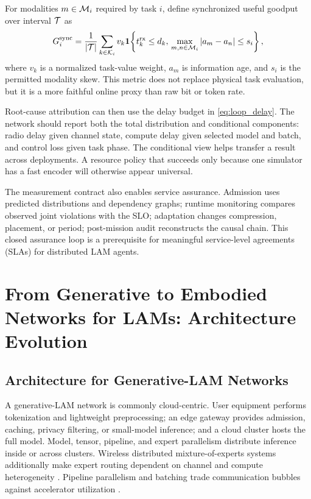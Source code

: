 \documentclass[letterpaper,journal]{IEEEtran}
\begin{document}
For modalities $m\in{\cal M}_i$ required by task $i$, define synchronized
useful goodput over interval ${\cal T}$ as
\begin{equation}
G_i^{\rm sync}=
\frac{1}{|{\cal T}|}
\sum_{k\in{\cal K}_i}
v_k{\bf 1}\!\left\{
t_k^{\rm rx}\le d_k,\,
\max_{m,n\in{\cal M}_i}|a_m-a_n|\le s_i
\right\},
\label{eq:syncgoodput}
\end{equation}
where $v_k$ is a normalized task-value weight, $a_m$ is information age, and
$s_i$ is the permitted modality skew. This metric does not replace physical
task evaluation, but it is a more faithful online proxy than raw bit or token
rate.

Root-cause attribution can then use the delay budget in
\eqref{eq:loop_delay}. The network should report both the total distribution
and conditional components: radio delay given channel state, compute delay
given selected model and batch, and control loss given task phase. The
conditional view helps transfer a result across deployments. A resource
policy that succeeds only because one simulator has a fast encoder will
otherwise appear universal.

The measurement contract also enables service assurance. Admission uses
predicted distributions and dependency graphs; runtime monitoring compares
observed joint violations with the SLO; adaptation changes compression,
placement, or period; post-mission audit reconstructs the causal chain. This
closed assurance loop is a prerequisite for meaningful service-level
agreements (SLAs) for distributed LAM agents.

\section{From Generative to Embodied Networks for LAMs: Architecture Evolution}
\label{sec:architecture}

\subsection{Architecture for Generative-LAM Networks}
A generative-LAM network is commonly cloud-centric. User equipment performs
tokenization and lightweight preprocessing; an edge gateway provides
admission, caching, privacy filtering, or small-model inference; and a cloud
cluster hosts the full model. Model, tensor, pipeline, and expert parallelism
distribute inference inside or across clusters. Wireless distributed
mixture-of-experts systems additionally make expert routing dependent on
channel and compute heterogeneity \cite{wdmoe}. Pipeline parallelism and
batching trade communication bubbles against accelerator utilization
\cite{pipeline}.
\end{document}
